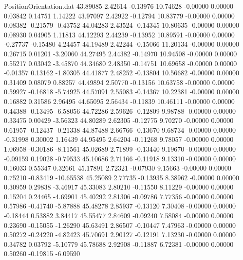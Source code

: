 \begin{filecontents}{PositionOrientation.dat}
  43.89085    2.42614   -0.13976    10.74628   -0.00000    0.00000    0.03842    0.14751    1.14222
  43.97097    2.42922   -0.12794    10.83779   -0.00000    0.00000    0.08382   -0.21579   -0.43752
  44.04283    2.43524   -0.14345    10.80635   -0.00000    0.00000    0.08930    0.04905    1.11813
  44.12293    2.44239   -0.13952    10.89591   -0.00000    0.00000   -0.27737   -0.15480    4.24457
  44.19489    2.42244   -0.15066    11.20134   -0.00000    0.00000    0.26715    0.01201   -3.20060
  44.27495    2.44382   -0.14970    10.94508   -0.00000    0.00000    0.55217    0.03042   -3.45870
  44.34680    2.48350   -0.14751    10.69658   -0.00000    0.00000   -0.01357    0.13162   -1.80305
  44.41877    2.48252   -0.13804    10.56682   -0.00000    0.00000    0.31409    0.08079    0.88257
  44.49894    2.50770   -0.13156    10.63758   -0.00000    0.00000    0.59927   -0.16818   -5.74925
  44.57091    2.55083   -0.14367    10.22381   -0.00000    0.00000    0.16882    0.31586    2.96495
  44.65095    2.56434   -0.11839    10.46111   -0.00000    0.00000    0.44388   -0.13495   -6.58056
  44.72286    2.59626   -0.12809     9.98788   -0.00000    0.00000    0.33475    0.00429   -3.56323
  44.80289    2.62305   -0.12775     9.70270   -0.00000    0.00000    0.61957   -0.12437   -0.21338
  44.87488    2.66766   -0.13670     9.68734   -0.00000    0.00000   -0.31998    0.30002    1.16439
  44.95495    2.64204   -0.11268     9.78057   -0.00000    0.00000    1.06958   -0.30186   -8.11561
  45.02689    2.71899   -0.13440     9.19670   -0.00000    0.00000   -0.09159    0.19028   -0.79533
  45.10686    2.71166   -0.11918     9.13310   -0.00000    0.00000    0.16033    0.55347    0.32661
  45.17891    2.72321   -0.07930     9.15663   -0.00000    0.00000    0.75210   -0.83419  -10.65538
  45.25089    2.77735   -0.13935     8.38962   -0.00000    0.00000    0.30959    0.29838   -3.46917
  45.33083    2.80210   -0.11550     8.11229   -0.00000    0.00000    0.15204    0.24465   -4.69901
  45.40292    2.81306   -0.09786     7.77356   -0.00000    0.00000    0.57986   -0.41740   -5.87888
  45.48278    2.85937   -0.13120     7.30408   -0.00000    0.00000   -0.18444    0.53882    3.84417
  45.55477    2.84609   -0.09240     7.58084   -0.00000    0.00000    0.23690   -0.15055   -1.26290
  45.63491    2.86507   -0.10447     7.47963   -0.00000    0.00000    0.50272   -0.24220   -4.82423
  45.70691    2.90127   -0.12191     7.13230   -0.00000    0.00000    0.34782    0.03792   -5.10779
  45.78688    2.92908   -0.11887     6.72381   -0.00000    0.00000    0.50260   -0.19815   -6.09590

\end{filecontents}
